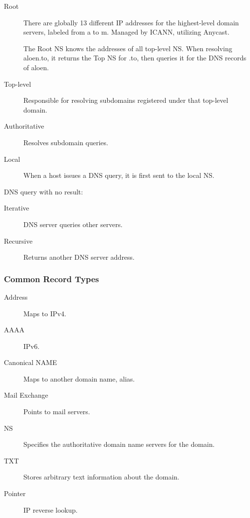 \documentclass[11pt,journal,compsoc]{IEEEtran}
\begin{document}
\begin{description}
    \item[Root] There are globally 13 different IP addresses for the highest-level domain servers, labeled from a to m. Managed by ICANN, utilizing Anycast.

    The Root NS knows the addresses of all top-level NS. When resolving aloen.to, it returns the Top NS for .to, then queries it for the DNS records of aloen.

    \item[Top-level] Responsible for resolving subdomains registered under that top-level domain.

    \item[Authoritative] Resolves subdomain queries.

    \item[Local] When a host issues a DNS query, it is first sent to the local NS.
\end{description}

DNS query with no result:

\begin{description}
    \item[Iterative] DNS server queries other servers.
    \item[Recursive] Returns another DNS server address.
\end{description}

\subsubsection{Common Record Types}

\begin{description}
    \item[Address] Maps to IPv4.

    \item[AAAA] IPv6.

    \item[Canonical NAME] Maps to another domain name, alias.

    \item[Mail Exchange] Points to mail servers.

    \item[NS] Specifies the authoritative domain name servers for the domain.

    \item[TXT] Stores arbitrary text information about the domain.

    \item[Pointer] IP reverse lookup.
\end{description}
\end{document}
